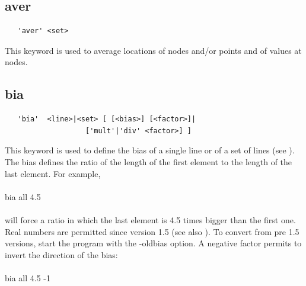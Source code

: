 \documentclass{article}
\begin{document}
\subsection{\label{aver}aver}
\begin{verbatim}
   'aver' <set>
\end{verbatim}
This keyword is used to average locations of nodes and/or points and of values at nodes.

\subsection{\label{bia}bia}
\begin{verbatim}
   'bia'  <line>|<set> [ [<bias>] [<factor>]|
                   ['mult'|'div' <factor>] ]
\end{verbatim}
This keyword is used to define the bias of a single line or of a set of lines (see ). The bias defines the ratio of the length of the first element to the length of the last element. For example,\\\\
bia all 4.5\\\\will force a ratio in which the last element is 4.5 times bigger than the first one. Real numbers are permitted since version 1.5 (see also ). To convert from pre 1.5 versions, start the program with the -oldbias option. A negative factor permits to invert the direction of the bias: \\\\
bia all 4.5 -1\\\\
\end{document}
